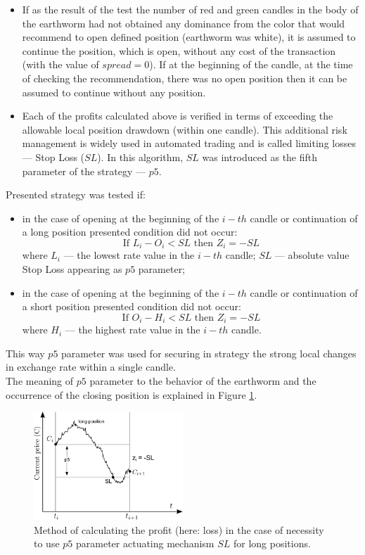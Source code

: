 \documentclass[runningheads,a4paper]{llncs}
\begin{document}
\begin{itemize}
\item If as the result of the test the number of red and green candles in the body of the earthworm had not obtained any dominance from the color that would recommend to open defined position (earthworm was white), it is assumed to continue the position, which is open, without any cost of the transaction (with the value of $spread = 0$). If at the beginning of the candle, at the time of checking the recommendation, there was no open position then it can be assumed to continue without any position.
\item Each of the profits calculated above is verified in terms of exceeding the allowable local position drawdown (within one candle). This additional risk management is widely used in automated trading and is called limiting losses --- Stop Loss ($SL$). In this algorithm, $SL$ was introduced as the fifth parameter of the strategy --- $p5$.
\end{itemize}

\noindent Presented strategy was tested if:
\begin{itemize}
\item in the case of opening at the beginning of the $i-th$ candle or continuation of a long position presented condition did not occur:\\
\begin{equation}
\text{If } L_i-O_i<SL \text{ then } Z_i=-SL
\end{equation}
where $L_i$ --– the lowest rate value in the $i-th$ candle; $SL$ --– absolute value Stop Loss appearing as $p5$ parameter;
\item in the case of opening at the beginning of the $i-th$ candle or continuation of a short position presented condition did not occur:
\begin{equation}
\text{If } O_i-H_i<SL \text{ then } Z_i=-SL
\end{equation}
where $H_i$ --– the highest rate value in the $i-th$ candle.
\end{itemize}
This way $p5$ parameter was used for securing in strategy the strong local changes in exchange rate within a single candle.\\
The meaning of $p5$ parameter to the behavior of the earthworm and the occurrence of the closing position is explained in Figure \ref{fig:fig5}.
\begin{figure}[h!]
\centering
\includegraphics[width = 0.5\textwidth]{figures/rys5.png}
\caption{Method of calculating the profit (here: loss) in the case of necessity to use $p5$ parameter actuating mechanism $SL$ for long positions.}
\label{fig:fig5}
\end{figure}
\FloatBarrier
\end{document}
